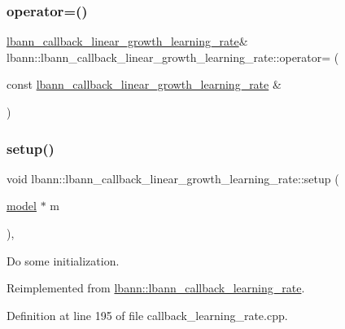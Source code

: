 \subsubsection{\texorpdfstring{operator=()}{operator=()}}
{\footnotesize\ttfamily \hyperlink{classlbann_1_1lbann__callback__linear__growth__learning__rate}{lbann\+\_\+callback\+\_\+linear\+\_\+growth\+\_\+learning\+\_\+rate}\& lbann\+::lbann\+\_\+callback\+\_\+linear\+\_\+growth\+\_\+learning\+\_\+rate\+::operator= (\begin{DoxyParamCaption}\item[{const \hyperlink{classlbann_1_1lbann__callback__linear__growth__learning__rate}{lbann\+\_\+callback\+\_\+linear\+\_\+growth\+\_\+learning\+\_\+rate} \&}]{ }\end{DoxyParamCaption})\hspace{0.3cm}{\ttfamily [default]}}

\mbox{\label{classlbann_1_1lbann__callback__linear__growth__learning__rate_afaa81836e0dc1b6220212dad52df25fc}} 
\subsubsection{\texorpdfstring{setup()}{setup()}}
{\footnotesize\ttfamily void lbann\+::lbann\+\_\+callback\+\_\+linear\+\_\+growth\+\_\+learning\+\_\+rate\+::setup (\begin{DoxyParamCaption}\item[{\hyperlink{classlbann_1_1model}{model} $\ast$}]{m }\end{DoxyParamCaption})\hspace{0.3cm}{\ttfamily [override]}, {\ttfamily [virtual]}}

Do some initialization. 

Reimplemented from \hyperlink{classlbann_1_1lbann__callback__learning__rate_a501f31a6b8fde1282a60e4b347e8d9d3}{lbann\+::lbann\+\_\+callback\+\_\+learning\+\_\+rate}.



Definition at line 195 of file callback\+\_\+learning\+\_\+rate.\+cpp.


